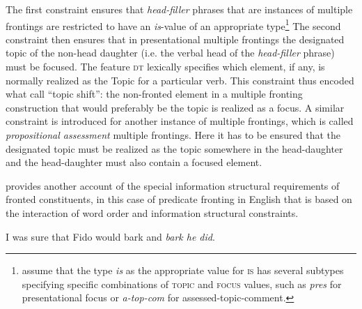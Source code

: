 \documentclass[output=paper]{langsci/langscibook}
\begin{document}
The first constraint ensures that \textit{head-filler} phrases that
are instances of multiple frontings are restricted to have an
\textit{is}-value of an appropriate type\footnote{\cite{BC2010a}
  assume that the type \textit{is} as the appropriate value for
  \textsc{is} has several subtypes specifying specific combinations of
  \textsc{topic} and \textsc{focus} values, such as \textit{pres} for
  presentational focus or \textit{a-top-com} for
  assessed-topic-comment.} The second constraint then ensures that in
presentational multiple frontings the designated topic of the non-head
daughter (i.e. the verbal head of the \textit{head-filler} phrase)
must be focused. The feature \textsc{dt} lexically specifies which
element, if any, is normally realized as the Topic for a particular
verb. This constraint thus encoded what \cite{BC2010a} call ``topic
shift'': the non-fronted element in a multiple fronting construction
that would preferably be the topic is realized as a focus. A similar
constraint is introduced for another instance of multiple frontings,
which is called \textit{propositional assessment} multiple
frontings. Here it has to be ensured that the designated topic must be
realized as the topic somewhere in the head-daughter and the
head-daughter must also contain a focused element.

\cite{Webelhuth2007a-u} provides another account of the special
information structural requirements of fronted constituents, in this
case of predicate fronting in English that is based on the interaction
of word order and information structural constraints.
\begin{exe}
  \ex I was sure that Fido would bark and \textit{bark he did}.
\end{exe}
\end{document}
